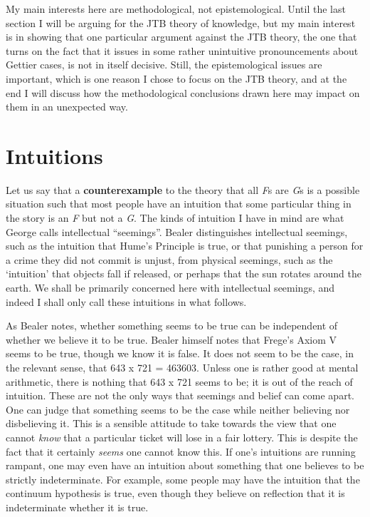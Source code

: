 My main interests here are methodological, not epistemological. Until the last section I will be arguing for the JTB theory of knowledge, but my main interest is in showing that one particular argument against the JTB theory, the one that turns on the fact that it issues in some rather unintuitive pronouncements about Gettier cases, is not in itself decisive. Still, the epistemological issues are important, which is one reason I chose to focus on the JTB theory, and at the end I will discuss how the methodological conclusions drawn here may impact on them in an unexpected way.


\section{Intuitions}

Let us say that a \textbf{counterexample} to the theory that all \textit{F}s are \textit{G}s is a possible situation such that most people have an intuition that some particular thing in the story is an \textit{F} but not a \textit{G}. The kinds of intuition I have in mind are what George \citet{Bealer1998} calls intellectual ``seemings''. Bealer distinguishes intellectual seemings, such as the intuition that Hume's Principle is true, or that punishing a person for a crime they did not commit is unjust, from physical seemings, such as the `intuition' that objects fall if released, or perhaps that the sun rotates around the earth. We shall be primarily concerned here with intellectual seemings, and indeed I shall only call these intuitions in what follows.

As Bealer notes, whether something seems to be true can be independent of whether we believe it to be true. Bealer himself notes that Frege's Axiom V seems to be true, though we know it is false. It does not seem to be the case, in the relevant sense, that 643 x 721 = 463603. Unless one is rather good at mental arithmetic, there is nothing that 643 x 721 seems to be; it is out of the reach of intuition. These are not the only ways that seemings and belief can come apart. One can judge that something seems to be the case while neither believing nor disbelieving it. This is a sensible attitude to take towards the view that one cannot \textit{know }that a particular ticket will lose in a fair lottery. This is despite the fact that it certainly \textit{seems} one cannot know this. If one's intuitions are running rampant, one may even have an intuition about something that one believes to be strictly indeterminate. For example, some people may have the intuition that the continuum hypothesis is true, even though they believe on reflection that it is indeterminate whether it is true.

